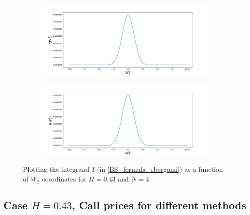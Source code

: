 \documentclass[11pt]{article}
\begin{document}
\begin{figure}[h!]
	\begin{subfigure}[b]{0.475\textwidth}
		\centering
		\includegraphics[width=1\linewidth]{./figures/integrand_plotting_rBergomi/1D_plots/N_4/H_043/Bergomi_integrand_K_1_H_043_W23_N_4}
		\caption{}
		\label{fig:sub3}
	\end{subfigure}
	\hfill
	\begin{subfigure}[b]{0.475\textwidth}
		\centering
		\includegraphics[width=1\linewidth]{./figures/integrand_plotting_rBergomi/1D_plots/N_4/H_043/Bergomi_integrand_K_1_H_043_W24_N_4}
		\caption{}
		\label{fig:sub4}
	\end{subfigure}
	\caption{Plotting the integrand $I$ (in \eqref{BS_formula_rbergomi}) as a function of $W_2$ coordinates for $H=0.43$ and $N=4$.}
	
	\label{fig:Integrand_H_043_N_4_W_2_1}
\end{figure}


\newpage

\subsection{Case $H=0.43$, Call prices for different methods}\label{appendix:Case $H=0.43$, Call prices for different methods}
\end{document}
